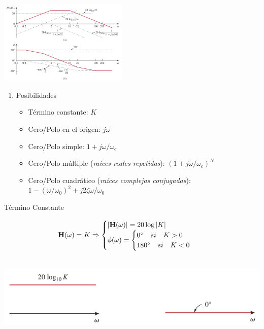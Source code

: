 \begin{center}
\includegraphics[height=4cm]{../figs/Bode.pdf}
\end{center}


\begin{enumerate}
\item Posibilidades
\begin{itemize}
\item Término constante: \(K\)
\item Cero/Polo en el origen: \(j\omega\)
\item Cero/Polo simple: \(1 + j\omega/\omega_c\)
\item Cero/Polo múltiple (\emph{raíces reales repetidas}): \((1 + j\omega/\omega_c)^N\)
\item Cero/Polo cuadrático (\emph{raíces complejas conjugadas}): \(1 - (\omega/\omega_0)^2 + j2\zeta\omega/\omega_0\)
\end{itemize}
\end{enumerate}

{Término Constante}

\[
  \mathbf{H}(\omega) = K \Rightarrow
  \begin{cases}
    |\mathbf{H}(\omega)| = 20 \log |K|\\
    \phi(\omega) = 
    \begin{cases}
      \ang{0} \quad si \quad K > 0\\
      \ang{180} \quad si \quad K < 0\\
    \end{cases}
  \end{cases}
\]

\begin{center}
\includegraphics[height=4cm]{../figs/BodeConstante.pdf}
\end{center}

